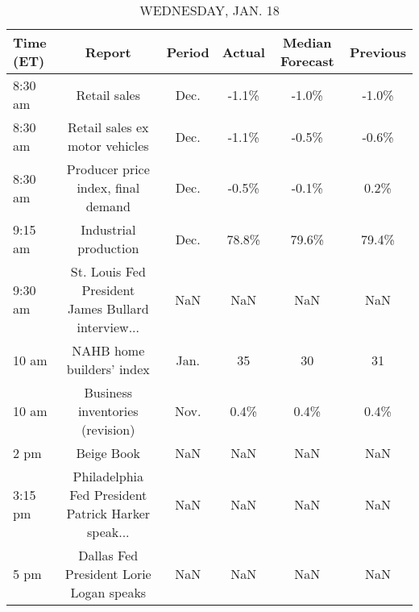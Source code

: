 \documentclass{article}%
\begin{document}
\begin{table}[htbp]%
\caption{WEDNESDAY, JAN. 18}%
\centering%
\begin{adjustbox}{width=1\textwidth}%
\begin{tabular}{lccccc}
\toprule
Time (ET) &                                             Report & Period & Actual & Median Forecast & Previous \\
\midrule
  8:30 am &                                       Retail sales &   Dec. &  -1.1\% &           -1.0\% &    -1.0\% \\
  8:30 am &                     Retail sales ex motor vehicles &   Dec. &  -1.1\% &           -0.5\% &    -0.6\% \\
  8:30 am &                 Producer price index, final demand &   Dec. &  -0.5\% &           -0.1\% &     0.2\% \\
  9:15 am &                              Industrial production &   Dec. &  78.8\% &           79.6\% &    79.4\% \\
  9:30 am & St. Louis Fed President James Bullard interview... &    NaN &    NaN &             NaN &      NaN \\
    10 am &                          NAHB home builders' index &   Jan. &     35 &              30 &       31 \\
    10 am &                    Business inventories (revision) &   Nov. &   0.4\% &            0.4\% &     0.4\% \\
     2 pm &                                         Beige Book &    NaN &    NaN &             NaN &      NaN \\
  3:15 pm & Philadelphia Fed President Patrick Harker speak... &    NaN &    NaN &             NaN &      NaN \\
     5 pm &            Dallas Fed President Lorie Logan speaks &    NaN &    NaN &             NaN &      NaN \\
\bottomrule
\end{tabular}
%
\end{adjustbox}%
\end{table}

%
\end{document}
